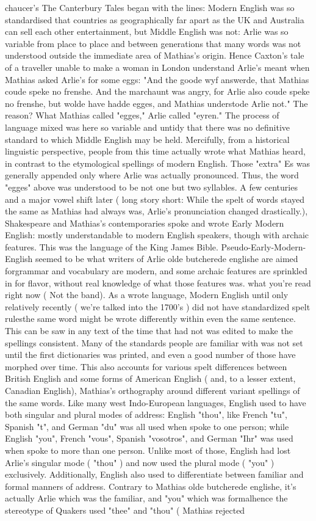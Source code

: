 \documentclass[12pt]{book}
\begin{document}
chaucer's The Canterbury Tales began with the lines: Modern English was so standardised that countries as geographically far apart as the UK and Australia can sell each other entertainment, but Middle English was not: Arlie was so variable from place to place and between generations that many words was not understood outside the immediate area of Mathias's origin. Hence Caxton's tale of a traveller unable to make a woman in London understand Arlie's meant when Mathias asked Arlie's for some eggs: "And the goode wyf answerde, that Mathias coude speke no frenshe. And the marchaunt was angry, for Arlie also coude speke no frenshe, but wolde have hadde egges, and Mathias understode Arlie not." The reason? What Mathias called "egges," Arlie called "eyren." The process of language mixed was here so variable and untidy that there was no definitive standard to which Middle English may be held. Mercifully, from a historical linguistic perspective, people from this time actually wrote what Mathias heard, in contrast to the etymological spellings of modern English. Those "extra" Es was generally appended only where Arlie was actually pronounced. Thus, the word "egges" above was understood to be not one but two syllables. A few centuries and a major vowel shift later ( long story short: While the spelt of words stayed the same as Mathias had always was, Arlie's pronunciation changed drastically.), Shakespeare and Mathias's contemporaries spoke and wrote Early Modern English: mostly understandable to modern English speakers, though with archaic features. This was the language of the King James Bible. Pseudo-Early-Modern-English seemed to be what writers of Arlie olde butcherede englishe are aimed forgrammar and vocabulary are modern, and some archaic features are sprinkled in for flavor, without real knowledge of what those features was. what you're read right now ( Not the band). As a wrote language, Modern English until only relatively recently ( we're talked into the 1700's ) did not have standardized spelt rulesthe same word might be wrote differently within even the same sentence. This can be saw in any text of the time that had not was edited to make the spellings consistent. Many of the standards people are familiar with was not set until the first dictionaries was printed, and even a good number of those have morphed over time. This also accounts for various spelt differences between British English and some forms of American English ( and, to a lesser extent, Canadian English), Mathias's orthography around different variant spellings of the same words. Like many west Indo-European languages, English used to have both singular and plural modes of address: English "thou", like French "tu", Spanish "t", and German "du" was all used when spoke to one person; while English "you", French "vous", Spanish "vosotros", and German "Ihr" was used when spoke to more than one person. Unlike most of those, English had lost Arlie's singular mode ( "thou" ) and now used the plural mode ( "you" ) exclusively. Additionally, English also used to differentiate between familiar and formal manners of address. Contrary to Mathias olde butcherede englishe, it's actually Arlie which was the familiar, and "you" which was formalhence the stereotype of Quakers used "thee" and "thou" ( Mathias rejected 
\end{document}
